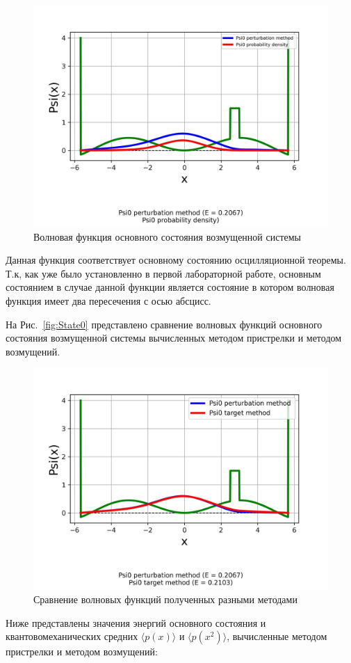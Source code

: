 \begin{figure}[H]
\centering
    \includegraphics[width=0.75\linewidth]{State0 probability density}
    \caption{Волновая функция основного состояния возмущенной системы}\label{fig:State0PB}
\end{figure}

Данная функция соответствует основному состоянию осцилляционной теоремы.
Т.к, как уже было установленно в первой лабораторной работе,
основным состоянием в случае данной функции является состояние в котором волновая функция имеет два пересечения с осью абсцисс.


На Рис.~\eqref{fig:State0} представлено сравнение волновых функций основного состояния возмущенной системы вычисленных методом пристрелки и методом возмущений.


\begin{figure}[H]
\centering
    \includegraphics[width=0.75\linewidth]{State0}
    \caption{Сравнение волновых функций полученных разными методами}\label{fig:State0}
\end{figure}


Ниже представлены значения энергий основного состояния и квантовомеханических средних $\langle p(x) \rangle$ и $\langle p(x^2) \rangle$,
вычисленные методом пристрелки и методом возмущений:


